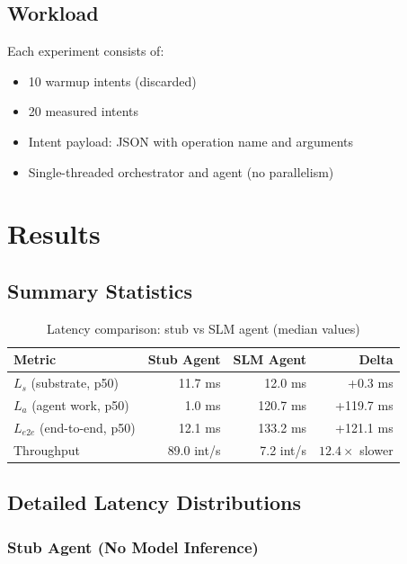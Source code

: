 \documentclass[11pt]{article}
\begin{document}
\subsection{Workload}

Each experiment consists of:
\begin{itemize}
\item 10 warmup intents (discarded)
\item 20 measured intents
\item Intent payload: JSON with operation name and arguments
\item Single-threaded orchestrator and agent (no parallelism)
\end{itemize}

\section{Results}

\subsection{Summary Statistics}

\begin{table}[h]
\centering
\begin{tabular}{lrrr}
\toprule
\textbf{Metric} & \textbf{Stub Agent} & \textbf{SLM Agent} & \textbf{Delta} \\
\midrule
$L_s$ (substrate, p50) & 11.7 ms & 12.0 ms & +0.3 ms \\
$L_a$ (agent work, p50) & 1.0 ms & 120.7 ms & +119.7 ms \\
$L_{e2e}$ (end-to-end, p50) & 12.1 ms & 133.2 ms & +121.1 ms \\
Throughput & 89.0 int/s & 7.2 int/s & $12.4\times$ slower \\
\bottomrule
\end{tabular}
\caption{Latency comparison: stub vs SLM agent (median values)}
\label{tab:summary}
\end{table}

\subsection{Detailed Latency Distributions}

\subsubsection{Stub Agent (No Model Inference)}
\end{document}

